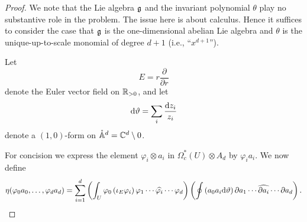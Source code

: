 \begin{proof}
We note that the Lie algebra $\mathfrak g$ and the invariant polynomial $\theta$ play no substantive role in the problem.
The issue here is about calculus.
Hence it suffices to consider the case that $\mathfrak g$ is the one-dimensional abelian Lie algebra and $\theta$ is the unique-up-to-scale monomial of degree $d+1$ (i.e., ``$x^{d+1}$'').

Let
\[
E = r \frac{\partial}{\partial r}
\]
denote the Euler vector field on $\mathbb R_{>0}$,
and let
\[
{\rm d} \vartheta = \sum_i \frac{{\rm d} z_i}{z_i} 
\]
denote a $(1,0)$-form on $\mathring{\mathbb A}^d = \mathbb C^{d} \setminus 0$. 

For concision we express the element $\varphi_i \otimes a_i $ in $\Omega^*_c(U) \otimes A_d $ by $\varphi_i a_i$.
We now define
\[
\eta(\varphi_0 a_0,\ldots,\varphi_da_d) = \sum_{i=1}^d \left(\int_U \varphi_0 \left(\iota_{E} \varphi_i \right) \varphi_1 \cdots \widehat{\varphi_i} \cdots \varphi_d\right)\left(\oint \left(a_0 a_i {\rm d} \vartheta\right) \partial a_1 \cdots \widehat{\partial a_i} \cdots \partial a_d \right)  .
\]
\end{proof}

